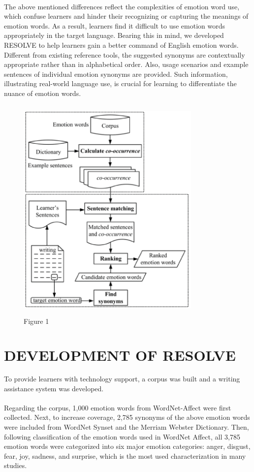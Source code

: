 \documentclass[a4paper,12pt,oneside]{article}
\begin{document}
\paragraph{}
The above mentioned differences reflect the complexities of emotion word use, which confuse learners and hinder their recognizing or capturing the meanings of emotion words. As a result, learners find it difficult to use emotion words appropriately in the target language. Bearing this in mind, we developed RESOLVE to help learners gain a better command of English emotion words. Different from existing reference tools, the suggested synonyms are contextually appropriate rather than in alphabetical order. Also, usage scenarios and example sentences of individual emotion synonyms are provided. Such information, illustrating real-world language use, is crucial for learning to differentiate the nuance of emotion words. 


\begin{figure}[H]
\includegraphics[height=11.25cm,width=9cm]{Figure1.png}
\centering
\caption{Figure 1}
\end{figure}

\newpage
\section{DEVELOPMENT OF RESOLVE}
To provide learners with technology support, a corpus was built and a writing assistance system was developed. 
\paragraph{}
Regarding the corpus, 1,000 emotion words from WordNet-Affect were first collected. Next, to increase coverage, 2,785 synonyms of the above emotion words were included from WordNet Synset and the Merriam Webster Dictionary. Then, following classification of the emotion words used in WordNet Affect, all 3,785 emotion words were categorized into six major emotion categories: anger, disgust, fear, joy, sadness, and surprise, which is the most used characterization in many studies. 
\end{document}

